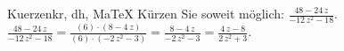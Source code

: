 \begin{MAufgabe}{Kuerzen}{kr, dh, MaTeX}
K\"urzen Sie soweit m\"oglich: $\frac{48 - 24\, z}{ - 12\, z^2 - 18}$.\\ 
\ifLsg\MLoesung
\quad $\frac{48 - 24\, z}{ - 12\, z^2 - 18}=\frac{(6)\cdot(8 - 4\, z)}{(6)\cdot( - 2\, z^2 - 3)}=\frac{8 - 4\, z}{ - 2\, z^2 - 3}=\frac{4\, z - 8}{2\, z^2 + 3}$.\else\relax\fi
 \end{MAufgabe}